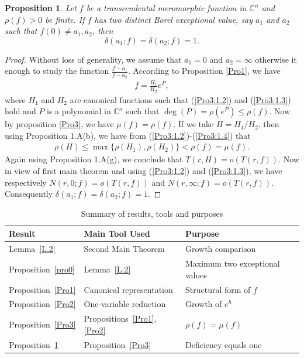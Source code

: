 \documentclass[11pt,reqno]{amsart}
\newtheorem{propo}{Proposition}[section]
\numberwithin{equation}{section}
\begin{document}
\begin{propo}\label{Pro4} Let $f$ be a transcendental meromorphic function in $\mathbb{C}^n$ and $\rho(f)>0$ be finite. If $f$ has two distinct Borel exceptional value, say $a_1$ and $a_2$ such that $f(0)\neq a_1,a_2$, then $$\delta(a_1;f)=\delta(a_2;f)=1.$$
\end{propo}
\begin{proof} Without loss of generality, we assume that $a_1=0$ and $a_2=\infty$ otherwise it enough to study the function $\frac{f-a_1}{f-a_2}$. According to Proposition \ref{Pro1}, we have
\begin{align}\label{Pro4:1.1}
f=\frac{H_1}{H_2}e^{P},
\end{align}
where $H_1$ and $H_2$ are canonical functions such that (\ref{Pro3:1.2}) and (\ref{Pro3:1.3}) hold and $P$ is a polynomial in $\mathbb{C}^n$ such that $\deg(P)=\rho(e^P)\leq \rho(f)$. Now by proposition \ref{Pro3}, we have $\mu(f)=\rho(f)$. If we take $H=H_1/H_2$, then using Proposition 1.A(b), we have from (\ref{Pro3:1.2})-(\ref{Pro3:1.4}) that
\begin{align*}
\rho(H)\leq \max\{\rho(H_1),\rho(H_2)\}<\rho(f)=\mu(f).
\end{align*}
Again using Proposition 1.A(g), we conclude that $T(r,H)=o(T(r,f))$. Now in view of first main theorem and using (\ref{Pro3:1.2}) and (\ref{Pro3:1.3}), we have respectively $N(r,0;f)=o(T(r,f))$ and $N(r,\infty;f)=o(T(r,f))$. Consequently $\delta(a_1;f)=\delta(a_2;f)=1$.
\end{proof}

\begin{table}[htbp]
	\centering
	\renewcommand{\arraystretch}{1.2}
	
	\begin{tabularx}{\textwidth}{||>{\centering\arraybackslash}p{3.2cm}||
			>{\centering\arraybackslash}p{4.8cm}||
			>{\centering\arraybackslash}p{6.0cm}||}
		\hline\hline
		\textbf{Result} & \textbf{Main Tool Used} & \textbf{Purpose} \\
		\hline\hline
		Lemma~\protect\ref{L.2} & Second Main Theorem & Growth comparison \\
		\hline
		Proposition~\protect\ref{pro0} & Lemma~\protect\ref{L.2} & Maximum two exceptional values \\
		\hline
		Proposition~\protect\ref{Pro1} & Canonical representation & Structural form of $f$ \\
		\hline
		Proposition~\protect\ref{Pro2} & One-variable reduction & Growth of $e^h$ \\
		\hline
		Proposition~\protect\ref{Pro3} & Propositions~\protect\ref{Pro1}, \protect\ref{Pro2} & $\rho(f)=\mu(f)$ \\
		\hline
		Proposition~\protect\ref{Pro4} & Proposition~\protect\ref{Pro3} & Deficiency equals one \\
		\hline\hline
	\end{tabularx}
	\vspace{.5cc}
\caption{Summary of results, tools and purposes}
\end{table}
\end{document}
